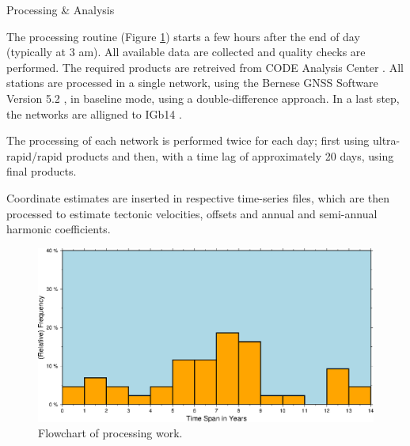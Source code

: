\documentclass[final,a0,portrait]{beamer}
\newlength{\onecolwid}
\begin{document}
\begin{frame}[t]
\begin{columns}[t]
\begin{column}{\onecolwid}
\begin{block}{Processing \& Analysis}

{\small
The processing routine (Figure \ref{fig:proc}) starts a few hours after the end of day (typically at 3 am). All available data are collected and quality 
checks are performed. The required products are retreived from CODE Analysis Center \cite{codeac}.
All stations are processed in a single network, using the Bernese GNSS Software Version 5.2 \cite{bernese}, in baseline mode, 
using a double-difference approach. In a last step, the networks are alligned to IGb14 \cite{igb14}.

The processing of each network is performed twice for each day; first using ultra-rapid/rapid products and then, with a time lag of approximately 20 days, using final products. 

Coordinate estimates are inserted in respective time-series files, which are then processed to estimate tectonic velocities, offsets and annual and semi-annual harmonic coefficients.
}

\begin{figure}
  \centering
  \includegraphics[width=0.7\onecolwid]{sample}
  \caption{Flowchart of processing work.}
  \label{fig:proc}
\end{figure}
\end{block}


\end{column}
\end{columns}
\end{frame}
\end{document}
